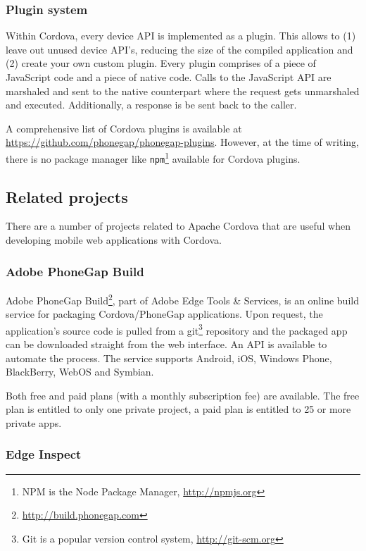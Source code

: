\subsubsection{Plugin system}

Within Cordova, every device API is implemented as a plugin. This allows to (1) leave out unused device API's, reducing the size of the compiled application and (2) create your own custom plugin. Every plugin comprises of a piece of JavaScript code and a piece of native code. Calls to the JavaScript API are marshaled and sent to the native counterpart where the request gets unmarshaled and executed. Additionally, a response is be sent back to the caller.

A comprehensive list of Cordova plugins is available at \url{https://github.com/phonegap/phonegap-plugins}. However, at the time of writing, there is no package manager like \texttt{npm}\footnote{NPM is the Node Package Manager, \url{http://npmjs.org}} available for Cordova plugins.

\subsection{Related projects}

There are a number of projects related to Apache Cordova that are useful when developing mobile web applications with Cordova.

\subsubsection{Adobe PhoneGap Build}

Adobe PhoneGap Build\footnote{\url{http://build.phonegap.com}}, part of Adobe Edge Tools \& Services, is an online build service for packaging Cordova/PhoneGap applications. Upon request, the application's source code is pulled from a git\footnote{Git is a popular version control system, \url{http://git-scm.org}} repository and the packaged app can be downloaded straight from the web interface. An API is available to automate the process. The service supports Android, iOS, Windows Phone, BlackBerry, WebOS and Symbian.

Both free and paid plans (with a monthly subscription fee) are available. The free plan is entitled to only one private project, a paid plan is entitled to 25 or more private apps.

\subsubsection{Edge Inspect}


